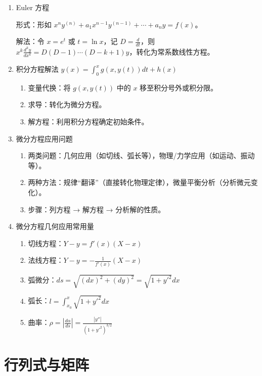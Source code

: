 \documentclass[UTF8]{ctexart}
\theoremstyle{remark}
\begin{document}
\begin{enumerate}
\item Euler 方程  

形式：形如 \(x^n y^{(n)} + a_1 x^{n-1} y^{(n-1)} + \cdots + a_n y = f(x)\)。  

解法：令 \(x = e^t\) 或 \(t = \ln x\)，记 \(D = \frac{d}{dt}\)，则 \(x^k \frac{d^k y}{dx^k} = D(D-1)\cdots(D-k+1)y\)，转化为常系数线性方程。  

\item 积分方程解法 \(y(x) = \int_0^x g(x, y(t))dt + h(x)\)  
\begin{enumerate}
	\item 变量代换：将 \(g(x, y(t))\) 中的 \(x\) 移至积分号外或积分限。  
	\item 求导：转化为微分方程。  
	\item 解方程：利用积分方程确定初始条件。  
\end{enumerate}  

\item 微分方程应用问题  
\begin{enumerate}
	\item 两类问题：几何应用（如切线、弧长等），物理/力学应用（如运动、振动等）。  
	\item 两种方法：规律“翻译”（直接转化物理定律），微量平衡分析（分析微元变化）。  
	\item 步骤：列方程 → 解方程 → 分析解的性质。  
\end{enumerate}  

\item 微分方程几何应用常用量  
\begin{enumerate}
	\item 切线方程：\(Y - y = f'(x)(X - x)\)  
	\item 法线方程：\(Y - y = -\frac{1}{f'(x)}(X - x)\)  
	\item 弧微分：\(ds = \sqrt{(dx)^2 + (dy)^2} = \sqrt{1 + y'^2}dx\)  
	\item 弧长：\(l = \int_{x_0}^x \sqrt{1 + y'^2}dx\)  
	\item 曲率：\(\rho = \left|\frac{d\alpha}{ds}\right| = \frac{|y''|}{(1 + y'^2)^{3/2}}\)  
\end{enumerate}
\end{enumerate}


\section{行列式与矩阵}
\end{document}
